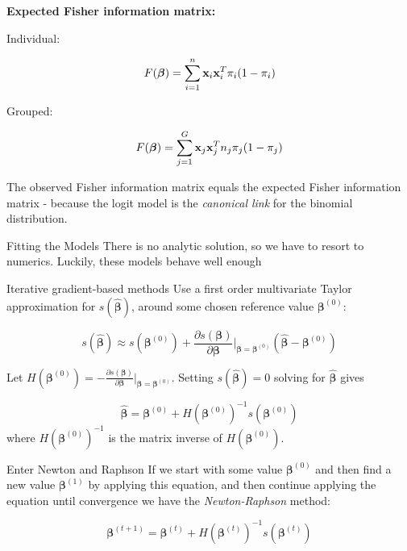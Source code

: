 \documentclass[
  ignorenonframetext,
]{beamer}
\begin{document}
\begin{frame}
\textbf{Expected Fisher information matrix:}

Individual:

\[F(\boldsymbol{\beta})=\sum_{i=1}^n {\bf x}_i {\bf x}_i^T\pi_i (1-\pi_i)\]

Grouped:

\[F(\boldsymbol{\beta})=\sum_{j=1}^G {\bf x}_j {\bf x}_j^T n_j \pi_j (1-\pi_j)\]

The observed Fisher information matrix equals the expected Fisher
information matrix - because the logit model is the \emph{canonical
link} for the binomial distribution.
\end{frame}

\begin{frame}
\begin{block}{Fitting the Models}
\protect\hypertarget{fitting-the-models}{}
There is no analytic solution, so we have to resort to numerics.
Luckily, these models behave well enough
\end{block}
\end{frame}

\begin{frame}
\begin{block}{Iterative gradient-based methods}
\protect\hypertarget{iterative-gradient-based-methods}{}
Use a first order multivariate Taylor approximation for
\(s(\hat{\boldsymbol{\beta}})\), around some chosen reference value
\(\boldsymbol{\beta}^{(0)}\):

\[
s(\hat{\boldsymbol{\beta}})\approx s(\boldsymbol{\beta}^{(0)})+\frac{\partial s(\boldsymbol{\beta})}{\partial \boldsymbol{\beta}}\big\rvert_{\boldsymbol{\beta}=\boldsymbol{\beta}^{(0)}} (\hat{\boldsymbol{\beta}}-\boldsymbol{\beta}^{(0)})
\]

Let
\(H(\boldsymbol{\beta}^{(0)})=-\frac{\partial s(\boldsymbol{\beta})}{\partial \boldsymbol{\beta}}\big\rvert_{\boldsymbol{\beta}=\boldsymbol{\beta}^{(0)}}\).
Setting \(s(\hat{\boldsymbol{\beta}})=0\) solving for
\(\hat{\boldsymbol{\beta}}\) gives

\[
\hat{\boldsymbol{\beta}}=\boldsymbol{\beta}^{(0)} + H(\boldsymbol{\beta}^{(0)})^{-1} s(\boldsymbol{\beta}^{(0)})
\] where \(H(\boldsymbol{\beta}^{(0)})^{-1}\) is the matrix inverse of
\(H(\boldsymbol{\beta}^{(0)})\).
\end{block}
\end{frame}

\begin{frame}
\begin{block}{Enter Newton and Raphson}
\protect\hypertarget{enter-newton-and-raphson}{}
If we start with some value \(\boldsymbol{\beta}^{(0)}\) and then find a
new value \(\boldsymbol{\beta}^{(1)}\) by applying this equation, and
then continue applying the equation until convergence we have the
\emph{Newton-Raphson} method:

\[\boldsymbol{\beta}^{(t+1)}=\boldsymbol{\beta}^{(t)} + H(\boldsymbol{\beta}^{(t)})^{-1} s(\boldsymbol{\beta}^{(t)})\]
\end{block}
\end{frame}
\end{document}
